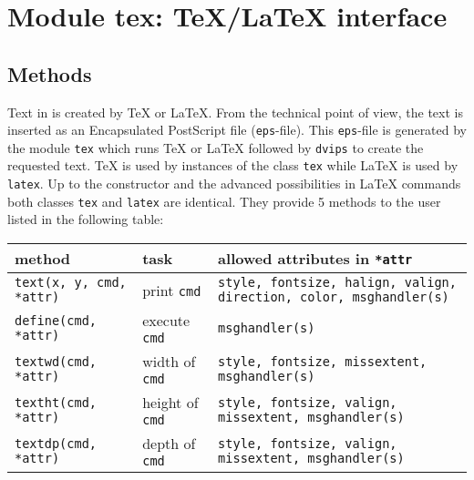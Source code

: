 \chapter{Module tex: \TeX/\LaTeX{} interface}
\label{tex}
\section{Methods}
Text in \PyX{} is created by \TeX{} or \LaTeX. From the technical point
of view, the text is inserted as an Encapsulated PostScript file
(\verb|eps|-file). This \verb|eps|-file is generated by the module
\verb|tex| which runs \TeX{} or \LaTeX{} followed by \verb|dvips| to
create the requested text. \TeX{} is used by instances of the class
\verb|tex| while \LaTeX{} is used by \verb|latex|. Up to the
constructor and the advanced possibilities in \LaTeX{} commands both
classes \verb|tex| and \verb|latex| are identical. They provide 5
methods to the user listed in the following table:

\smallskip
\begin{tabularx}{\linewidth}{ll>{\raggedright\arraybackslash}X}
method&task&allowed attributes in \texttt{*attr}\\
\hline
\texttt{text(x, y, cmd, *attr)}&print \texttt{cmd}&\texttt{style, fontsize, halign, valign, direction, color, msghandler(s)}\\
\texttt{define(cmd, *attr)}&execute \texttt{cmd}&\texttt{msghandler(s)}\\
\texttt{textwd(cmd, *attr)}&width of \texttt{cmd}&\texttt{style, fontsize, missextent, msghandler(s)}\\
\texttt{textht(cmd, *attr)}&height of \texttt{cmd}&\texttt{style, fontsize, valign, missextent, msghandler(s)}\\
\texttt{textdp(cmd, *attr)}&depth of \texttt{cmd}&\texttt{style, fontsize, valign, missextent, msghandler(s)}\\
\end{tabularx}
\smallskip

